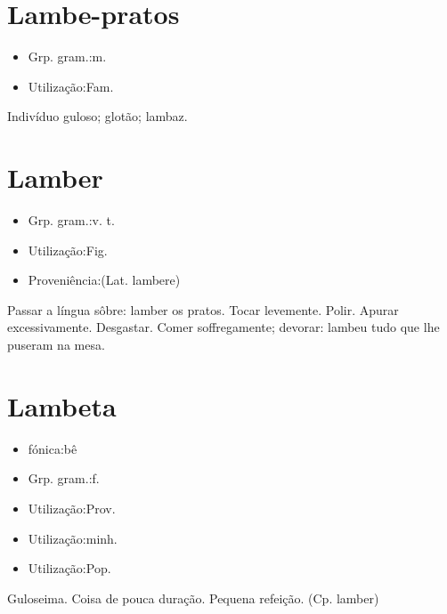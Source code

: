 \section{Lambe-pratos}
\begin{itemize}
\item {Grp. gram.:m.}
\end{itemize}
\begin{itemize}
\item {Utilização:Fam.}
\end{itemize}
Indivíduo guloso; glotão; lambaz.
\section{Lamber}
\begin{itemize}
\item {Grp. gram.:v. t.}
\end{itemize}
\begin{itemize}
\item {Utilização:Fig.}
\end{itemize}
\begin{itemize}
\item {Proveniência:(Lat. \textunderscore lambere\textunderscore )}
\end{itemize}
Passar a língua sôbre: \textunderscore lamber os pratos\textunderscore .
Tocar levemente.
Polir.
Apurar excessivamente.
Desgastar.
Comer soffregamente; devorar: \textunderscore lambeu tudo que lhe puseram na mesa\textunderscore .
\section{Lambeta}
\begin{itemize}
\item {fónica:bê}
\end{itemize}
\begin{itemize}
\item {Grp. gram.:f.}
\end{itemize}
\begin{itemize}
\item {Utilização:Prov.}
\end{itemize}
\begin{itemize}
\item {Utilização:minh.}
\end{itemize}
\begin{itemize}
\item {Utilização:Pop.}
\end{itemize}
Guloseima.
Coisa de pouca duração.
Pequena refeição.
(Cp. \textunderscore lamber\textunderscore )

